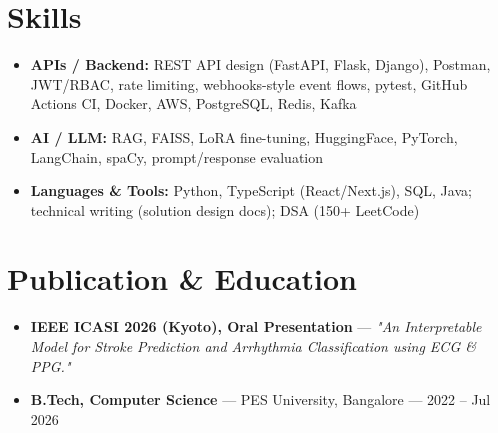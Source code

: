 \documentclass[10pt,a4paper]{article}
\begin{document}
\section*{Skills}
\begin{itemize}
\item \textbf{APIs / Backend:} REST API design (FastAPI, Flask, Django), Postman, JWT/RBAC, rate limiting, webhooks-style event flows, pytest, GitHub Actions CI, Docker, AWS, PostgreSQL, Redis, Kafka
\item \textbf{AI / LLM:} RAG, FAISS, LoRA fine-tuning, HuggingFace, PyTorch, LangChain, spaCy, prompt/response evaluation
\item \textbf{Languages \& Tools:} Python, TypeScript (React/Next.js), SQL, Java; technical writing (solution design docs); DSA (150+ LeetCode)
\end{itemize}
\section*{Publication \& Education}
\begin{itemize}
\item \textbf{IEEE ICASI 2026 (Kyoto), Oral Presentation} --- \textit{"An Interpretable Model for Stroke Prediction and Arrhythmia Classification using ECG \& PPG."}
\item \textbf{B.Tech, Computer Science} --- PES University, Bangalore --- 2022 -- Jul 2026
\end{itemize}
\end{document}
